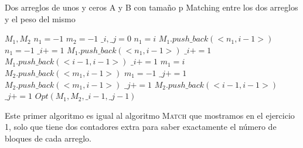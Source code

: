\documentclass[12pt]{article}
\newcommand{\TITLE}[1]{\item[#1]}
\begin{document}
\begin{algorithmic}[1]
    \REQUIRE Dos arreglos de unos y ceros A y B con tamaño p
    \ENSURE Matching entre los dos arreglos y el peso del mismo
    \TITLE{\textsc{Match}$(A,B,p)$}                                                 
    \STATE $M_1,M_2$         
    \STATE $n_1 = -1$                                                               
    \STATE $m_2 = -1$                                                               
    \STATE $\_i,\_j = 0$                                                            
            \STATE $n_1 = i$                                                        
            \STATE $M_1.push\_back(<n_1,i-1>)$                
            \STATE $n_1 = -1$                                          
            \STATE $\_i += 1$                                          
        \ENDIF
            \STATE $M_1.push\_back(<n_1,i-1>)$                              
            \STATE $\_i += 1$                                               
            \STATE $M_1.push\_back(<i-1,i-1>)$                       
            \STATE $\_i += 1$                                                      
        \ENDIF
            \STATE $m_1 = i$                                             
            \STATE $M_2.push\_back(<m_1,i-1>)$                      
            \STATE $m_1 = -1$               
            \STATE $\_j += 1$  
        \ENDIF
            \STATE $M_2.push\_back(<m_1,i-1>)$                                
            \STATE $\_j += 1$                                                  
            \STATE $M_2.push\_back(<i-1,i-1>)$ 
            \STATE $\_j += 1$  
        \ENDIF
    \ENDFOR
    \RETURN $Opt(M_1,M_2,\_i-1,\_j-1)$
\end{algorithmic}

Este primer algoritmo es igual al algoritmo \textsc{Match} que mostramos en el ejercicio 1, solo que tiene dos contadores extra para saber exactamente el número de bloques de cada arreglo. 
\end{document}
